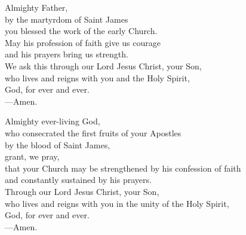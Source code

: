 \prayer


\begin{prayerverse}
Almighty Father,\\
by the martyrdom of Saint James\\
you blessed the work of the early Church.\\
May his profession of faith give us courage\\
and his prayers bring us strength.\\
We ask this through our Lord Jesus Christ, your Son,\\
who lives and reigns with you and the Holy Spirit,\\
God, for ever and ever.\\
{\color{red}---\thinspace}Amen.
\end{prayerverse}


\begin{prayerverse}
Almighty ever-living God,\\
who consecrated the first fruits of your Apostles\\
by the blood of Saint James,\\
grant, we pray,\\
that your Church may be strengthened by his confession of faith\\
and constantly sustained by his prayers.\\
Through our Lord Jesus Christ, your Son,\\
who lives and reigns with you in the unity of the Holy Spirit,\\
God, for ever and ever.\\
{\color{red}---\thinspace}Amen.
\end{prayerverse}

